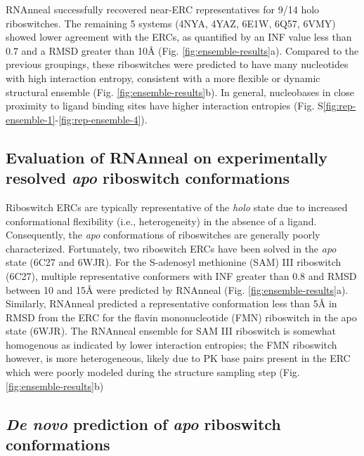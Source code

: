 \documentclass[%
aip,
 amsmath,amssymb,
reprint,%
twocolumn,
]{revtex4-1}
\newcommand{\lh}[1]{{\color{red}{#1}}}
\begin{document}
{RNAnneal successfully recovered near-ERC representatives for 9/14 holo riboswitches. The remaining 5 systems (4NYA\cite{Warner2014}, 4YAZ\cite{ren2015structural}, 6E1W\cite{Numata2019}, 6Q57\cite{Dunstan2018}, 6VMY\cite{Chan2020}) showed lower agreement with the ERCs, as quantified by an INF value less than $0.7$ and a RMSD greater than 10{\AA} (Fig. \ref{fig:ensemble-results}a). Compared to the previous groupings, these riboswitches were predicted to have many nucleotides with high interaction entropy, consistent with a more flexible or dynamic structural ensemble (Fig. \ref{fig:ensemble-results}b). In general, nucleobases in close proximity to ligand binding sites have higher interaction entropies (Fig. S\ref{fig:rep-ensemble-1}-\ref{fig:rep-ensemble-4}).


\subsection*{Evaluation of RNAnneal on experimentally resolved \textrm{\textbf{\textit{apo}}}  riboswitch conformations}

Riboswitch ERCs are typically representative of the {\it holo} state due to increased conformational flexibility (i.e., heterogeneity) in the absence of a ligand. Consequently, the {\it apo} conformations of riboswitches are generally poorly characterized. Fortunately, two riboswitch ERCs have been solved in the {\it apo} state (6C27\cite{Grigg2018} and 6WJR\cite{Wilt2020}). For the S-adenosyl methionine (SAM) III riboswitch (6C27\cite{Grigg2018}), multiple representative conformers with INF greater than 0.8 and RMSD between  10 and 15{\AA} were predicted by RNAnneal (Fig. \ref{fig:ensemble-results}a). Similarly, RNAnneal predicted a representative conformation less than 5{\AA} in RMSD from the ERC for the flavin mononucleotide (FMN) riboswitch in the apo state (6WJR\cite{Wilt2020}). The RNAnneal ensemble for SAM III riboswitch is somewhat homogenous as indicated by lower interaction entropies; the FMN riboswitch however, is more heterogeneous, likely due to PK base pairs present in the ERC which were poorly modeled during the structure sampling step (Fig. \ref{fig:ensemble-results}b)

\subsection*{\textrm{\textbf{\textit{De novo}}} prediction of \textrm{\textbf{\textit{apo}}} riboswitch conformations}


}
\end{document}
